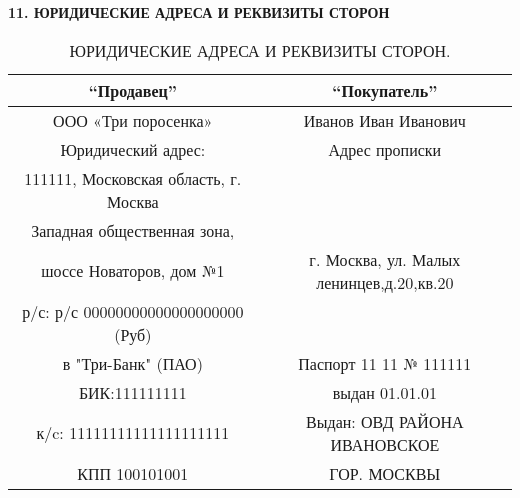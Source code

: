 \documentclass[a4paper,12pt]{article}
\begin{document}
\begin{center}
 \vspace{1 ex}
 \textbf{11. ЮРИДИЧЕСКИЕ АДРЕСА И РЕКВИЗИТЫ СТОРОН }
 \vspace{1ex}
    \end{center}


\begin{table}
\caption{\label{tab:canonsummary}ЮРИДИЧЕСКИЕ АДРЕСА И РЕКВИЗИТЫ СТОРОН.}
\begin{center}
\begin{tabular}{|c|c|}
\hline
“Продавец”  & “Покупатель” \\
\hline
ООО «Три поросенка»
 & Иванов Иван Иванович \\
Юридический адрес: & Адрес прописки  \\
 111111, Московская область, г. Москва\\ Западная общественная зона, \\шоссе Новаторов, дом №1 &  г. Москва, ул. Малых ленинцев,д.20,кв.20\\
\hline

\hline
р/с: р/с 00000000000000000000  (Руб)\\ в "Три-Банк" (ПАО) & Паспорт 11 11 № 111111 \\
БИК:111111111 & выдан 01.01.01 \\
к/c: 11111111111111111111 & Выдан: ОВД РАЙОНА ИВАНОВСКОЕ\\
КПП 100101001 & ГОР. МОСКВЫ \\
\hline
\end{tabular}
\end{center}
\end{table}
\end{document}
